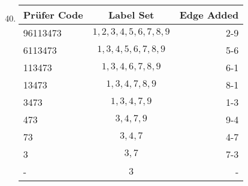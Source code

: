 \documentclass[12pt]{article}
\newcommand{\s}[1]{\setcounter{enumi}{#1}}
\begin{document}
\begin{enumerate}
  \s{39}
  \item
    \begin{tabular}{|l|c|r|}
      \hline
      Pr\"{u}fer Code & Label Set & Edge Added \\ \hline
      96113473 & ${1, 2, 3, 4, 5, 6, 7, 8, 9}$ & 2-9\\
      6113473 & ${1, 3, 4, 5, 6, 7, 8, 9}$ & 5-6\\
      113473 & ${1, 3, 4, 6, 7, 8, 9}$ & 6-1\\
      13473 & ${1, 3, 4, 7, 8, 9}$ & 8-1\\
      3473 & ${1, 3, 4, 7, 9}$ & 1-3\\
      473 & ${3, 4, 7, 9}$ & 9-4\\
      73 & ${3, 4, 7}$ & 4-7\\
      3 & ${3, 7}$ & 7-3\\
      - & ${3}$ & -\\ \hline
    \end{tabular}

\end{enumerate}
\end{document}
